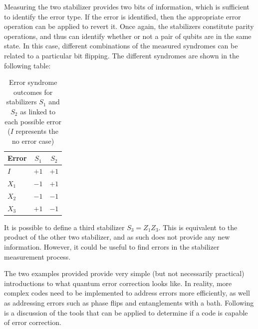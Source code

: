 Measuring the two stabilizer provides two bits of information, which is sufficient to identify the error type. If the error is identified, then the appropriate error operation can be applied to revert it. Once again, the stabilizers constitute parity operations, and thus can identify whether or not a pair of qubits are in the same state. In this case, different combinations of the measured syndromes can be related to a particular bit flipping. The different syndromes are shown in the following table:
\begin{table}[hbt!]
    \centering
    \begin{tabular}{ l || c | c}
        Error & $S_1$ & $S_2$ \\ 
         \hline \hline
         $I$ & $+1$ & $+1$ \\ 
         $X_1$ & $-1$ & $+1$\\ 
         $X_2$ & $-1$ & $-1$\\
         $X_3$ & $+1$ & $-1$
    \end{tabular}
\caption[Error syndrome outcomes for stabilizers in the three-qubit code]{Error syndrome outcomes for stabilizers $S_1$ and $S_2$ as linked to each possible error ($I$ represents the no error case)}
\end{table}

It is possible to define a third stabilizer $S_3=Z_1Z_3$. This is equivalent to the product of the other two stabilizer, and as such does not provide any new information. However, it could be useful to find errors in the stabilizer measurement process.

The two examples provided provide very simple (but not necessarily practical) introductions to what quantum error correction looks like. In reality, more complex codes need to be implemented to address errors more efficiently, as well as addressing errors such as phase flips and entanglements with a bath. Following is a discussion of the tools that can be applied to determine if a code is capable of error correction.


